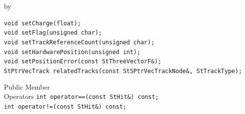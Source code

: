 \documentclass[twoside]{article}
\newcommand{\entrylabel}[1]{\mbox{\textbf{{#1}}}\hfil}%
\newenvironment{entry}
{\begin{list}{}%
    {\renewcommand{\makelabel}{\entrylabel}%
     \setlength{\labelwidth}{90pt}%
     \setlength{\leftmargin}{\labelwidth}
     \advance\leftmargin by \labelsep%
      }%
    }%
  {\end{list}}
\newcommand{\Entrylabel}[1]%
{\raisebox{0pt}[1ex][0pt]{\makebox[\labelwidth][l]%
    {\parbox[t]{\labelwidth}{\hspace{0pt}\textbf{{#1}}}}}}
\newenvironment{Entry}%
{\renewcommand{\entrylabel}{\Entrylabel}\begin{entry}}%
  {\end{entry}}
\begin{document}
\begin{Entry}
    \verb+void setCharge(float);+\\
    \verb+void setFlag(unsigned char);+\\
    \verb+void setTrackReferenceCount(unsigned char);+\\
    \verb+void setHardwarePosition(unsigned int);+\\
    \verb+void setPositionError(const StThreeVectorF&);+\\
    \verb+StPtrVecTrack relatedTracks(const StSPtrVecTrackNode&, StTrackType);+\\
    
\item[Public Member\\ Operators]
    \verb+int operator==(const StHit&) const;+\\
    \verb+int operator!=(const StHit&) const;+\\
\end{Entry}
\clearpage
\end{document}
